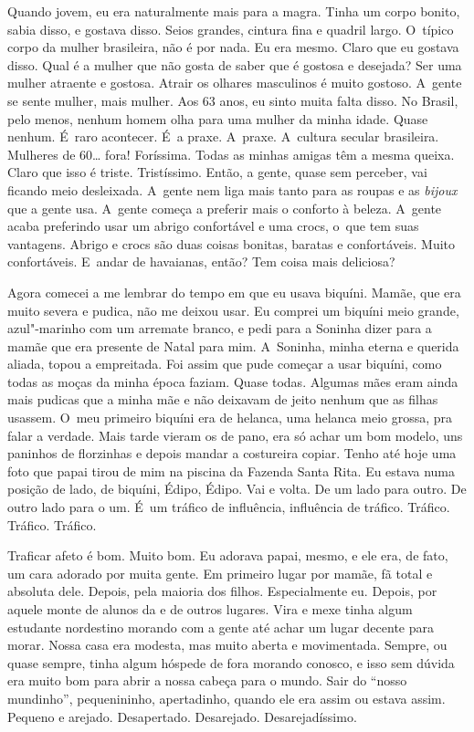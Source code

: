 Quando jovem, eu era naturalmente mais para a magra. Tinha um corpo
bonito, sabia disso, e gostava disso. Seios grandes, cintura fina e
quadril largo. O~típico corpo da mulher brasileira, não é por nada. Eu
era mesmo. Claro que eu gostava disso. Qual é a mulher que não gosta de
saber que é gostosa e desejada? Ser uma mulher atraente e gostosa.
Atrair os olhares masculinos é muito gostoso. A~gente se sente mulher,
mais mulher. Aos 63 anos, eu sinto muita falta disso. No Brasil, pelo
menos, nenhum homem olha para uma mulher da minha idade. Quase nenhum. É~raro acontecer. É~a praxe. A~praxe. A~cultura secular brasileira.
Mulheres de 60… fora! Foríssima. Todas as minhas amigas têm a
mesma queixa. Claro que isso é triste. Tristíssimo. Então, a gente,
quase sem perceber, vai ficando meio desleixada. A~gente nem liga mais
tanto para as roupas e as \emph{bijoux} que a gente usa. A~gente começa
a preferir mais o conforto à beleza. A~gente acaba preferindo usar um
abrigo confortável e uma crocs, o~que tem suas vantagens. Abrigo e crocs
são duas coisas bonitas, baratas e confortáveis. Muito confortáveis. E~andar de havaianas, então? Tem coisa mais deliciosa?

Agora comecei a me lembrar do tempo em que eu usava biquíni. Mamãe, que
era muito severa e pudica, não me deixou usar. Eu comprei um biquíni
meio grande, azul"-marinho com um arremate branco, e pedi para a Soninha
dizer para a mamãe que era presente de Natal para mim. A~Soninha, minha
eterna e querida aliada, topou a empreitada. Foi assim que pude começar
a usar biquíni, como todas as moças da minha época faziam. Quase todas.
Algumas mães eram ainda mais pudicas que a minha mãe e não deixavam de
jeito nenhum que as filhas usassem. O~meu primeiro biquíni era de
helanca, uma helanca meio grossa, pra falar a verdade. Mais tarde vieram
os de pano, era só achar um bom modelo, uns paninhos de florzinhas e
depois mandar a costureira copiar. Tenho até hoje uma foto que papai
tirou de mim na piscina da Fazenda Santa Rita. Eu estava numa posição de
lado, de biquíni, Édipo, Édipo. Vai e volta. De um lado para outro. De
outro lado para o um. É~um tráfico de influência, influência de tráfico.
Tráfico. Tráfico. Tráfico.

Traficar afeto é bom. Muito bom. Eu adorava papai, mesmo, e ele era, de
fato, um cara adorado por muita gente. Em primeiro lugar por mamãe, fã
total e absoluta dele. Depois, pela maioria dos filhos. Especialmente
eu. Depois, por aquele monte de alunos da  e de outros lugares. Vira
e mexe tinha algum estudante nordestino morando com a gente até achar um
lugar decente para morar. Nossa casa era modesta, mas muito aberta e
movimentada. Sempre, ou quase sempre, tinha algum hóspede de fora
morando conosco, e isso sem dúvida era muito bom para abrir a nossa
cabeça para o mundo. Sair do ``nosso mundinho'', pequenininho,
apertadinho, quando ele era assim ou estava assim. Pequeno e arejado.
Desapertado. Desarejado. Desarejadíssimo.

